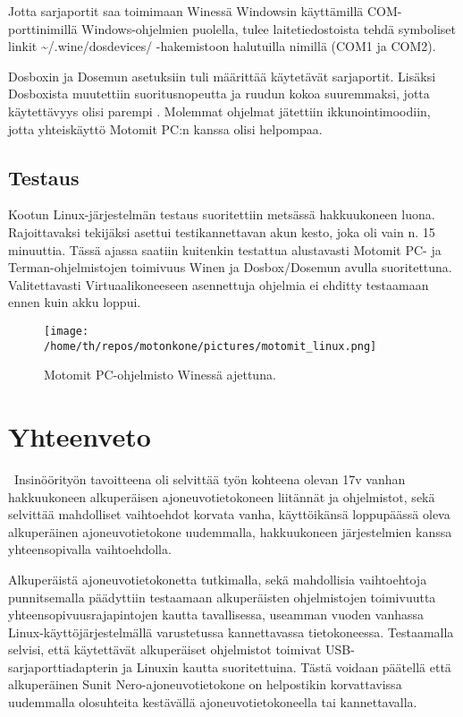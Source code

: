 \documentclass[11pt,a4paper,oneside,article]{memoir}
\begin{document}
Jotta sarjaportit saa toimimaan Winessä Windowsin käyttämillä COM-porttinimillä Windows-ohjelmien puolella, tulee laitetiedostoista tehdä symboliset linkit \textasciitilde{}/.wine/dosdevices/ -hakemistoon halutuilla nimillä (COM1 ja COM2).\cite[s. 21]{wine:manual}

Dosboxin ja Dosemun asetuksiin tuli määrittää käytetävät sarjaportit. Lisäksi Dosboxista muutettiin suoritusnopeutta ja ruudun kokoa suuremmaksi, jotta käytettävyys olisi parempi \cite{dosbox:conf}. Molemmat ohjelmat jätettiin ikkunointimoodiin, jotta yhteiskäyttö Motomit PC:n kanssa olisi helpompaa.

\section{Testaus}
Kootun Linux-järjestelmän testaus suoritettiin metsässä hakkuukoneen luona. Rajoittavaksi tekijäksi asettui testikannettavan akun kesto, joka oli vain n. 15 minuuttia. Tässä ajassa saatiin kuitenkin testattua alustavasti Motomit PC- ja Terman-ohjelmistojen toimivuus Winen ja Dosbox/Dosemun avulla suoritettuna. Valitettavasti Virtuaalikoneeseen asennettuja ohjelmia ei ehditty testaamaan ennen kuin akku loppui.

\begin{figure}[H]
\centering
\texttt{[image: /home/th/repos/motonkone/pictures/motomit\_linux.png]}
\caption{Motomit PC-ohjelmisto Winessä ajettuna.}
\end{figure}

\newpage
\chapter{Yhteenveto}\
Insinöörityön tavoitteena oli selvittää työn kohteena olevan 17v vanhan hakkuukoneen alkuperäisen ajoneuvotietokoneen liitännät ja ohjelmistot, sekä selvittää mahdolliset vaihtoehdot korvata vanha, käyttöikänsä loppupäässä oleva alkuperäinen ajoneuvotietokone uudemmalla, hakkuukoneen järjestelmien kanssa yhteensopivalla vaihtoehdolla.

Alkuperäistä ajoneuvotietokonetta tutkimalla, sekä mahdollisia vaihtoehtoja punnitsemalla päädyttiin testaamaan alkuperäisten ohjelmistojen toimivuutta yhteensopivuusrajapintojen kautta tavallisessa, useamman vuoden vanhassa Linux-käyttöjärjestelmällä varustetussa kannettavassa tietokoneessa. Testaamalla selvisi, että käytettävät alkuperäiset ohjelmistot toimivat USB-sarjaporttiadapterin ja Linuxin kautta suoritettuina. Tästä voidaan päätellä että alkuperäinen Sunit Nero-ajoneuvotietokone on helpostikin korvattavissa uudemmalla olosuhteita kestävällä ajoneuvotietokoneella tai kannettavalla.
\end{document}
